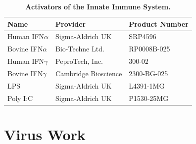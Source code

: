 \begin{table}
\centering
\begin{tabular}{lll}
\toprule
\textbf{Name} & \textbf{Provider}    & \textbf{Product Number} \\ \midrule
Human IFN\(\alpha\)    & Sigma-Aldrich UK     & SRP4596                 \\ 
Bovine IFN\(\alpha\)   & Bio-Techne Ltd.      & RP0008B-025             \\ 
Human IFN\(\gamma\)    & PeproTech, Inc.      & 300-02                  \\ 
Bovine IFN\(\gamma\)   & Cambridge Bioscience & 2300-BG-025             \\ 
LPS           & Sigma-Aldrich UK     & L4391-1MG               \\ 
Poly I:C      & Sigma-Aldrich UK     & P1530-25MG              \\ \bottomrule
\end{tabular}
\caption[Activators of the Innate Immune System.]{\textbf{Activators of the Innate Immune System.}}
\label{tab:Activators of the Innate Immune System Table}
\end{table}

\section{Virus Work} \label{sec:Virus Work}
